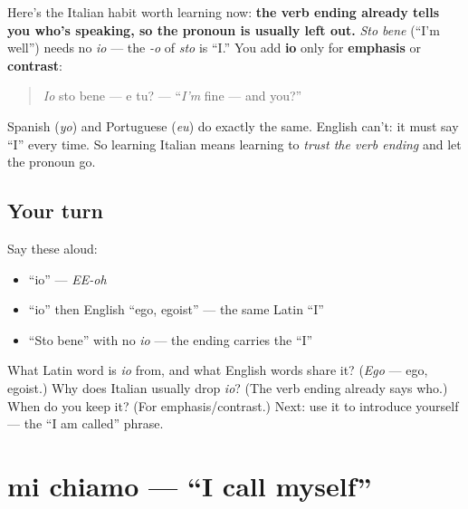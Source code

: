 \begin{grammarlens}[title={Grammar Lens: the dropped subject (pro-drop)}]
Here's the Italian habit worth learning now: \textbf{the verb ending already tells you who's speaking, so the pronoun is usually left out.} \emph{Sto bene} (\textquotedblleft{}I'm well\textquotedblright{}) needs no \emph{io} — the \emph{-o} of \emph{sto} is \textquotedblleft{}I.\textquotedblright{} You add \textbf{io} only for \textbf{emphasis} or \textbf{contrast}:

\begin{quote}
\emph{Io} sto bene — e tu? — \textquotedblleft{}\emph{I'm} fine — and you?\textquotedblright{}
\end{quote}

Spanish (\emph{yo}) and Portuguese (\emph{eu}) do exactly the same. English can't: it must say \textquotedblleft{}I\textquotedblright{} every time. So learning Italian means learning to \emph{trust the verb ending} and let the pronoun go.
\end{grammarlens}

\subsection*{Your turn}
Say these aloud:

\begin{itemize}
\raggedright
  \item \textquotedblleft{}io\textquotedblright{} — \emph{EE-oh}
  \item \textquotedblleft{}io\textquotedblright{} then English \textquotedblleft{}ego, egoist\textquotedblright{} — the same Latin \textquotedblleft{}I\textquotedblright{}
  \item \textquotedblleft{}Sto bene\textquotedblright{} with no \emph{io} — the ending carries the \textquotedblleft{}I\textquotedblright{}
\end{itemize}

\begin{tcolorbox}[breakable,colback=teal!4,colframe=teal!35!black,title={Before you move on}]
What Latin word is \emph{io} from, and what English words share it? (\emph{Ego} — ego, egoist.) Why does Italian usually drop \emph{io}? (The verb ending already says who.) When do you keep it? (For emphasis/contrast.) Next: use it to introduce yourself — the \textquotedblleft{}I am called\textquotedblright{} phrase.
\end{tcolorbox}
\section[mi chiamo]{mi chiamo — \textquotedblleft{}I call myself\textquotedblright{}}

